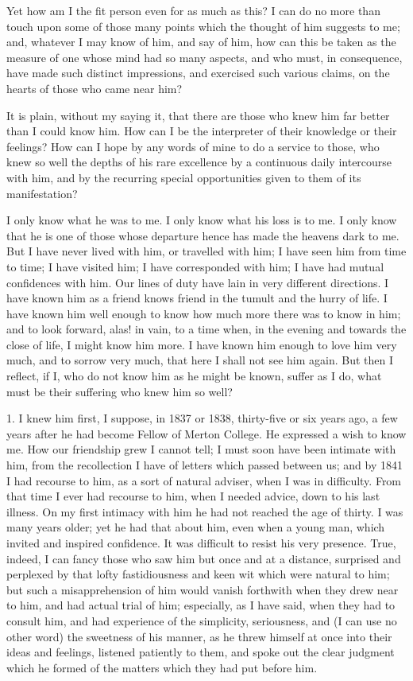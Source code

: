Yet how am I the fit person even for as much as this?
I can do no more than touch upon some of those many
points which the thought of him suggests to me; and,
whatever I may know of him, and say of him, how can this
be taken as the measure of one whose mind had so many
aspects, and who must, in consequence, have made such
distinct impressions, and exercised such various claims,
on the hearts of those who came near him?

It is plain, without my saying it, that there are
those who knew him far better than I could know him. How
can I be the interpreter of their knowledge or their
feelings? How can I hope by any words of mine to do a
service to those, who knew so well the depths of his rare
excellence by a continuous daily intercourse with him,
and by the recurring special opportunities given to them
of its manifestation?

I only know what he was to me. I only know what his
loss is to me. I only know that he is one of those whose
departure hence has made the heavens dark to me. But I
have never lived with him, or travelled with him; I have
seen him from time to time; I have visited him; I have
corresponded with him; I have had mutual confidences with
him. Our lines of duty have lain in very different
directions. I have known him as a friend knows friend in
the tumult and the hurry of life. I have known him well
enough to know how much more there was to know in him;
and to look forward, alas! in vain, to a time when, in
the evening and towards the close of life, I might know
him more. I have known him enough to love him very much,
and to sorrow very much, that here I shall not see him
again. But then I reflect, if I, who do not know him as
he might be known, suffer as I do, what must be their
suffering who knew him so well?

1. I knew him first, I suppose, in 1837 or 1838,
thirty-five or six years ago, a few years after he had
become Fellow of Merton College. He expressed a wish to
know me. How our friendship grew I cannot tell; I must
soon have been intimate with him, from the recollection I
have of letters which passed between us; and by 1841 I
had recourse to him, as a sort of natural adviser, when I
was in difficulty. From that time I ever had recourse to
him, when I needed advice, down to his last illness. On
my first intimacy with him he had not reached the age of
thirty. I was many years older; yet he had that about
him, even when a young man, which invited and inspired
confidence. It was difficult to resist his very presence.
True, indeed, I can fancy those who saw him but once and
at a distance, surprised and perplexed by that lofty
fastidiousness and keen wit which were natural to him;
but such a misapprehension of him would vanish forthwith
when they drew near to him, and had actual trial of him;
especially, as I have said, when they had to consult him,
and had experience of the simplicity, seriousness, and (I
can use no other word) the sweetness of his manner, as he
threw himself at once into their ideas and feelings,
listened patiently to them, and spoke out the clear
judgment which he formed of the matters which they had
put before him.

